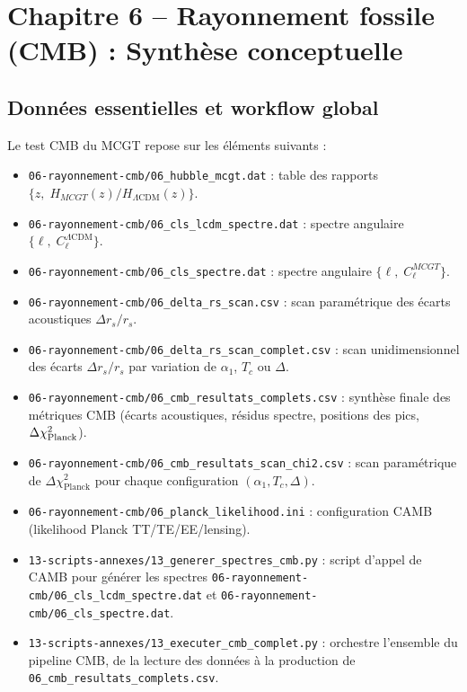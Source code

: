 \section{Chapitre 6 – Rayonnement fossile (CMB) : Synthèse conceptuelle}

\subsection{Données essentielles et workflow global}
Le test CMB du MCGT repose sur les éléments suivants :
\begin{itemize}
  \item \texttt{06-rayonnement-cmb/06\_hubble\_mcgt.dat} : table des rapports
        \(\{z,\;H_{MCGT}(z)/H_{\Lambda\mathrm{CDM}}(z)\}\).
  \item \texttt{06-rayonnement-cmb/06\_cls\_lcdm\_spectre.dat} : spectre angulaire
        \(\{\ell,\;C_{\ell}^{\Lambda\mathrm{CDM}}\}\).
  \item \texttt{06-rayonnement-cmb/06\_cls\_spectre.dat} : spectre angulaire
        \(\{\ell,\;C_{\ell}^{MCGT}\}\).
  \item \texttt{06-rayonnement-cmb/06\_delta\_rs\_scan.csv} : scan paramétrique des écarts acoustiques \(\Delta r_{s}/r_{s}\).
  \item \texttt{06-rayonnement-cmb/06\_delta\_rs\_scan\_complet.csv} : scan unidimensionnel des écarts \(\Delta r_{s}/r_{s}\) par variation de \(\alpha_{1}\), \(T_{c}\) ou \(\Delta\).
  \item \texttt{06-rayonnement-cmb/06\_cmb\_resultats\_complets.csv} : synthèse finale des métriques CMB (écarts acoustiques, résidus spectre, positions des pics, \(\Delta\chi^2_{\rm Planck}\)).
  \item \texttt{06-rayonnement-cmb/06\_cmb\_resultats\_scan\_chi2.csv} : scan paramétrique de \(\Delta\chi^2_{\mathrm{Planck}}\) pour chaque configuration \((\alpha_{1},T_{c},\Delta)\).
  \item \texttt{06-rayonnement-cmb/06\_planck\_likelihood.ini} : configuration CAMB (likelihood Planck TT/TE/EE/lensing).
  \item \texttt{13-scripts-annexes/13\_generer\_spectres\_cmb.py} : script d’appel de CAMB pour générer les spectres
        \texttt{06-rayonnement-cmb/06\_cls\_lcdm\_spectre.dat} et \texttt{06-rayonnement-cmb/06\_cls\_spectre.dat}.
  \item \texttt{13-scripts-annexes/13\_executer\_cmb\_complet.py} : orchestre l’ensemble du pipeline CMB, de la lecture des données à la production de \texttt{06\_cmb\_resultats\_complets.csv}.
\end{itemize}

